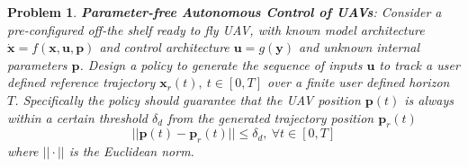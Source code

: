 \documentclass[letterpaper, 10 pt, conference]{ieeeconf}  %
\newtheorem{problem}{Problem}
\begin{document}
\begin{problem}

 \textbf{\textit{Parameter-free Autonomous Control of UAVs}}: 
Consider a pre-configured off-the shelf ready to fly UAV, with known model architecture $\dot{\bm{x}}=f(\bm{x},\bm{u},\bm{p})$ and control architecture $\bm{u}=g(\bm{y})$ and unknown internal parameters $\bm{p}$. Design a policy to generate the sequence of inputs $\mathbf{u}$ to track a user defined reference trajectory $\bm{x}_r(t),~ t \in [0,T]$ over a finite user defined horizon $T$. Specifically the policy should guarantee that the UAV position $\bm{p}(t)$ is always within a certain threshold $\delta_d$ from the generated trajectory position $\bm{p}_r(t)$
 \begin{equation} \label{eq:positlive}
        ||\mathbf{p}(t)-\mathbf{p}_r(t)|| \leq \delta_d,~\forall t \in [0,T]
    \end{equation}
    where $||\cdot||$ is the Euclidean norm.

\end{problem}


%
\end{document}

